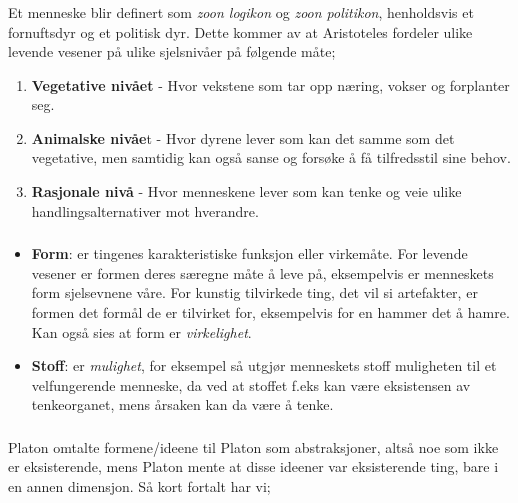 \documentclass[a4paper]{IEEEtran}
\begin{document}
        \subsubsection{}
        Et menneske blir definert som \textit{zoon logikon} og \textit{zoon politikon},
        henholdsvis et fornuftsdyr og et politisk dyr. Dette kommer av at 
        Aristoteles fordeler ulike levende vesener på ulike sjelsnivåer på følgende
        måte;

        \begin{enumerate}
            \item \textbf{Vegetative nivået} - Hvor vekstene som tar opp næring,
            vokser og forplanter seg. 
            \item \textbf{Animalske nivåe}t - Hvor dyrene lever som kan det samme som 
            det vegetative, men samtidig kan også sanse og forsøke å få
            tilfredsstil sine behov.
            \item \textbf{Rasjonale nivå} - Hvor menneskene lever som 
            kan tenke og veie ulike handlingsalternativer mot hverandre.
        \end{enumerate} \medskip

        \subsubsection{}
        \begin{itemize}
            \item \textbf{Form}: er tingenes karakteristiske funksjon eller virkemåte.
            For levende vesener er formen deres særegne måte å leve på, 
            eksempelvis er menneskets form sjelsevnene våre. For kunstig tilvirkede
            ting, det vil si artefakter, er formen det formål de er tilvirket for,
            eksempelvis for en hammer det å hamre. Kan også sies at form er 
            \textit{virkelighet}.

            \item \textbf{Stoff}: er \textit{mulighet}, for eksempel så 
            utgjør menneskets stoff muligheten til et velfungerende menneske, da 
            ved at stoffet f.eks kan være eksistensen av tenkeorganet, mens årsaken 
            kan da være å tenke. 
        \end{itemize} \cite{rephefte_aristoteles} \medskip

        \subsubsection{}
        Platon omtalte formene/ideene til Platon som abstraksjoner, altså noe som 
        ikke er eksisterende, mens Platon mente at disse ideener var eksisterende ting, 
        bare i en annen dimensjon. Så kort fortalt har vi;
\end{document}
